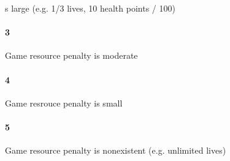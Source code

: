 s large (e.g. 1/3 lives, 10 health points / 100)\paragraph{3}Game resource penalty is moderate\paragraph{4}Game resrouce penalty is small\paragraph{5}Game resource penalty is nonexistent (e.g. unlimited lives)\subsub